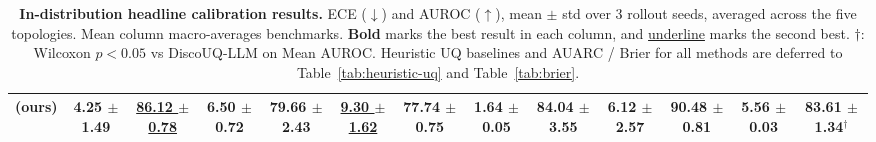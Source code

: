 \begin{table}[!t]
{\begin{tabular}{l c c c c c c c c c c c c}
\midrule
\rowcolor[RGB]{222,230,241}
\textbf{\methodname{} (ours)}
                   & \textbf{4.25 {\scriptsize $\pm$ 1.49}}  & \underline{86.12 {\scriptsize $\pm$ 0.78}}
                   & \textbf{6.50 {\scriptsize $\pm$ 0.72}}  & \textbf{79.66 {\scriptsize $\pm$ 2.43}}
                   & \underline{9.30 {\scriptsize $\pm$ 1.62}} & \textbf{77.74 {\scriptsize $\pm$ 0.75}}
                   & \textbf{1.64 {\scriptsize $\pm$ 0.05}}  & \textbf{84.04 {\scriptsize $\pm$ 3.55}}
                   & \textbf{6.12 {\scriptsize $\pm$ 2.57}}  & \textbf{90.48 {\scriptsize $\pm$ 0.81}}
                   & \textbf{5.56 {\scriptsize $\pm$ 0.03}}  & \textbf{83.61 {\scriptsize $\pm$ 1.34}}$^\dagger$ \\
\bottomrule
\end{tabular}%
}
\vspace{-5pt}
\caption{\textbf{In-distribution headline calibration results.}
ECE ($\downarrow$) and AUROC ($\uparrow$), mean $\pm$ std over 3
rollout seeds, averaged across the five topologies. Mean column
macro-averages benchmarks. \textbf{Bold} marks the best result in each column, and \underline{underline} marks the second best. $\dagger$: Wilcoxon $p{<}0.05$ vs
DiscoUQ-LLM on Mean AUROC.
Heuristic UQ baselines and AUARC / Brier for all methods are
deferred to Table~\ref{tab:heuristic-uq} and Table~\ref{tab:brier}.}
\label{tab:main}
\vspace{-15pt}
\end{table}
